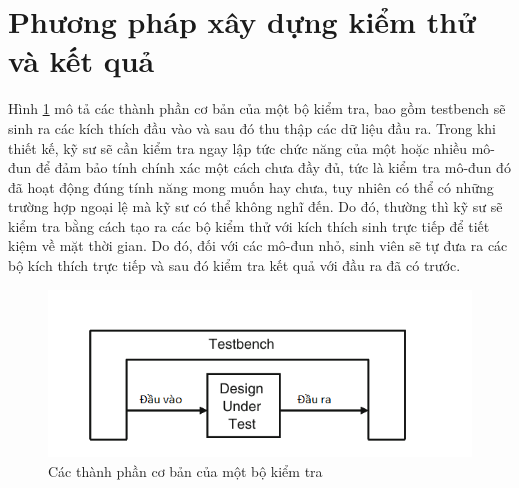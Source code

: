 \section{Phương pháp xây dựng kiểm thử và kết quả}
Hình \ref{fig:testComponents} mô tả các thành phần cơ bản của một bộ kiểm tra, bao gồm testbench sẽ sinh ra các kích thích đầu vào và sau đó thu thập các dữ liệu đầu ra.
Trong khi thiết kế, kỹ sư sẽ cần kiểm tra ngay lập tức chức năng của một hoặc nhiều mô-đun để đảm bảo tính chính xác một cách chưa đầy đủ, tức là kiểm tra mô-đun đó đã hoạt động đúng tính năng mong muốn hay chưa, tuy nhiên có thể có những trường hợp ngoại lệ mà kỹ sư có thể không nghĩ đến. Do đó, thường thì kỹ sư sẽ kiểm tra bằng cách tạo ra các bộ kiểm thử với kích thích sinh trực tiếp để tiết kiệm về mặt thời gian. Do đó, đối với các mô-đun nhỏ, sinh viên sẽ tự đưa ra các bộ kích thích trực tiếp và sau đó kiểm tra kết quả với đầu ra đã có trước. 

\begin{figure}[!ht]
	\centering
	\includegraphics[width=\linewidth]{figures/testComponents.png}
	\caption{Các thành phần cơ bản của một bộ kiểm tra}
	\label{fig:testComponents}
\end{figure}

